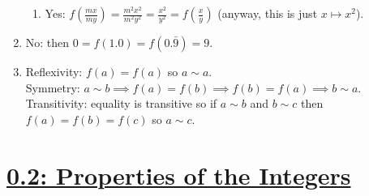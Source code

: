 \documentclass[]{article}
\begin{document}
\begin{enumerate}
\begin{enumerate}
\item Yes: $f\left(\frac{mx}{my}\right) = \frac{m^2x^2}{m^2y^2} = \frac{x^2}{y^2} = f\left(\frac{x}{y}\right)$ (anyway, this is just $x \mapsto x^2$).
\end{enumerate}
\item No: then $0 = f(1.0) = f(0.\bar{9}) = 9$. 
\item Reflexivity: $f(a) = f(a)$ so $a \sim a$. \\
Symmetry: $a \sim b \implies f(a) = f(b) \implies f(b) = f(a) \implies b\sim a$. \\
Transitivity: equality is transitive so if $a \sim b$ and $b \sim c$ then $f(a) = f(b) = f(c)$ so $a \sim c$.
\end{enumerate}





\section*{\underline{0.2: Properties of the Integers}}
\end{document}
